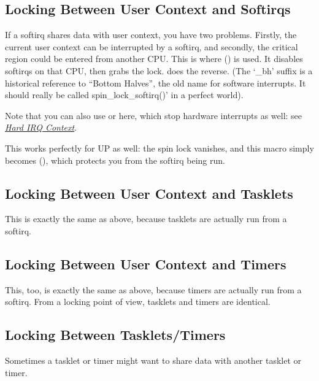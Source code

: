 \documentclass[a4paper,8pt,english]{sphinxmanual}
\begin{document}
\subsection{Locking Between User Context and Softirqs}
\label{kernel-hacking/locking:locking-between-user-context-and-softirqs}
If a softirq shares data with user context, you have two problems.
Firstly, the current user context can be interrupted by a softirq, and
secondly, the critical region could be entered from another CPU. This is
where  () is
used. It disables softirqs on that CPU, then grabs the lock.
 does the reverse. (The `\_bh' suffix is
a historical reference to ``Bottom Halves'', the old name for software
interrupts. It should really be called spin\_lock\_softirq()' in a
perfect world).

Note that you can also use  or
 here, which stop hardware interrupts
as well: see {\hyperref[kernel\string-hacking/locking:hardirq\string-context]{\emph{Hard IRQ Context}}}.

This works perfectly for UP as well: the spin lock vanishes, and this
macro simply becomes 
(), which protects you from the softirq
being run.


\subsection{Locking Between User Context and Tasklets}
\label{kernel-hacking/locking:locking-between-user-context-and-tasklets}
This is exactly the same as above, because tasklets are actually run
from a softirq.


\subsection{Locking Between User Context and Timers}
\label{kernel-hacking/locking:locking-between-user-context-and-timers}
This, too, is exactly the same as above, because timers are actually run
from a softirq. From a locking point of view, tasklets and timers are
identical.


\subsection{Locking Between Tasklets/Timers}
\label{kernel-hacking/locking:locking-between-tasklets-timers}
Sometimes a tasklet or timer might want to share data with another
tasklet or timer.
\end{document}
